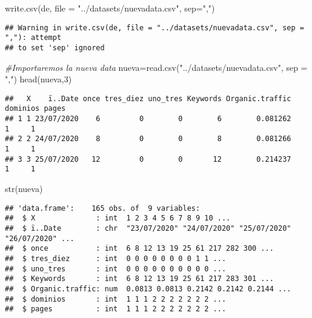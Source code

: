 \documentclass[
]{article}
\newenvironment{Shaded}{\begin{snugshade}}{\end{snugshade}}
\newcommand{\AttributeTok}[1]{\textcolor[rgb]{0.77,0.63,0.00}{#1}}
\newcommand{\CommentTok}[1]{\textcolor[rgb]{0.56,0.35,0.01}{\textit{#1}}}
\newcommand{\DecValTok}[1]{\textcolor[rgb]{0.00,0.00,0.81}{#1}}
\newcommand{\FunctionTok}[1]{\textcolor[rgb]{0.00,0.00,0.00}{#1}}
\newcommand{\NormalTok}[1]{#1}
\newcommand{\OtherTok}[1]{\textcolor[rgb]{0.56,0.35,0.01}{#1}}
\newcommand{\StringTok}[1]{\textcolor[rgb]{0.31,0.60,0.02}{#1}}
\begin{document}
\begin{Shaded}
\begin{Highlighting}[]
\FunctionTok{write.csv}\NormalTok{(de, }\AttributeTok{file =} \StringTok{"../datasets/nuevadata.csv"}\NormalTok{, }\AttributeTok{sep=}\StringTok{","}\NormalTok{)}
\end{Highlighting}
\end{Shaded}

\begin{verbatim}
## Warning in write.csv(de, file = "../datasets/nuevadata.csv", sep = ","): attempt
## to set 'sep' ignored
\end{verbatim}

\begin{Shaded}
\begin{Highlighting}[]
\CommentTok{\#Importaremos la nueva data}
\NormalTok{nueva}\OtherTok{=}\FunctionTok{read.csv}\NormalTok{(}\StringTok{"../datasets/nuevadata.csv"}\NormalTok{, }\AttributeTok{sep =} \StringTok{","}\NormalTok{)}
\FunctionTok{head}\NormalTok{(nueva,}\DecValTok{3}\NormalTok{)}
\end{Highlighting}
\end{Shaded}

\begin{verbatim}
##   X    ï..Date once tres_diez uno_tres Keywords Organic.traffic dominios pages
## 1 1 23/07/2020    6         0        0        6        0.081262        1     1
## 2 2 24/07/2020    8         0        0        8        0.081266        1     1
## 3 3 25/07/2020   12         0        0       12        0.214237        1     1
\end{verbatim}

\begin{Shaded}
\begin{Highlighting}[]
\FunctionTok{str}\NormalTok{(nueva)}
\end{Highlighting}
\end{Shaded}

\begin{verbatim}
## 'data.frame':    165 obs. of  9 variables:
##  $ X              : int  1 2 3 4 5 6 7 8 9 10 ...
##  $ ï..Date        : chr  "23/07/2020" "24/07/2020" "25/07/2020" "26/07/2020" ...
##  $ once           : int  6 8 12 13 19 25 61 217 282 300 ...
##  $ tres_diez      : int  0 0 0 0 0 0 0 0 1 1 ...
##  $ uno_tres       : int  0 0 0 0 0 0 0 0 0 0 ...
##  $ Keywords       : int  6 8 12 13 19 25 61 217 283 301 ...
##  $ Organic.traffic: num  0.0813 0.0813 0.2142 0.2142 0.2144 ...
##  $ dominios       : int  1 1 1 2 2 2 2 2 2 2 ...
##  $ pages          : int  1 1 1 2 2 2 2 2 2 2 ...
\end{verbatim}
\end{document}
